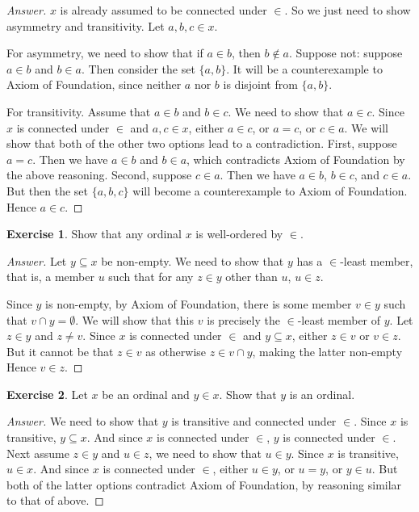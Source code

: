 \documentclass[11pt]{article}
\theoremstyle{definition}
\newtheorem{exer}{Exercise}
\begin{document}
\begin{proof}[Answer]
$x$ is already assumed to be connected under $\in$. So we just need to show asymmetry and transitivity. Let $a, b, c \in x$. 

For asymmetry, we need to show that if $a \in b$, then $b \notin a$. Suppose not: suppose $a \in b$ and $b \in a$. Then consider the set $\{a, b\}$. It will be a counterexample to Axiom of Foundation, since neither $a$ nor $b$ is disjoint from $\{a, b\}$.

For transitivity. Assume that $a \in b$ and $b \in c$. We need to show that $a \in c$. Since $x$ is connected under $\in$ and $a, c \in x$, either $a \in c$, or $a = c$, or $c \in a$. We will show that both of the other two options lead to a contradiction. First, suppose $a = c$. Then we have $a \in b$ and $b \in a$, which contradicts Axiom of Foundation by the above reasoning. Second, suppose $c \in a$. Then we have $a \in b$, $b \in c$, and $c \in a$. But then the set $\{a, b, c\}$ will become a counterexample to Axiom of Foundation. Hence $a \in c$.

\end{proof}

\begin{exer}
Show that any ordinal $x$ is well-ordered by $\in$. 
\end{exer}

\begin{proof}[Answer]
Let $y \subseteq x$ be non-empty. We need to show that $y$ has a $\in$-least member, that is, a member $u$ such that for any $z \in y$ other than $u$, $u \in z$.

Since $y$ is non-empty, by Axiom of Foundation, there is some member $v \in y$ such that $v \cap y = \emptyset$. We will show that this $v$ is precisely the $\in$-least member of $y$. Let $z \in y$ and $z \neq v$. Since $x$ is connected under $\in$ and $y \subseteq x$, either $z \in v$ or $v \in z$. But it cannot be that $z \in v$ as otherwise $z \in v \cap y$, making the latter non-empty Hence $v \in z$.
 
\end{proof}

\begin{exer}
Let $x$ be an ordinal and $y \in x$. Show that $y$ is an ordinal.
\end{exer}

\begin{proof}[Answer]
We need to show that $y$ is transitive and connected under $\in$. Since $x$ is transitive, $y \subseteq x$. And since $x$ is connected under $\in$, $y$ is connected under $\in$. Next assume $z \in y$ and $u \in z$, we need to show that $u \in y$. Since $x$ is transitive, $u \in x$. And since $x$ is connected under $\in$, either $u \in y$, or $u = y$, or $y \in u$. But both of the latter options contradict Axiom of Foundation, by reasoning similar to that of above. 

\end{proof}
\end{document}
